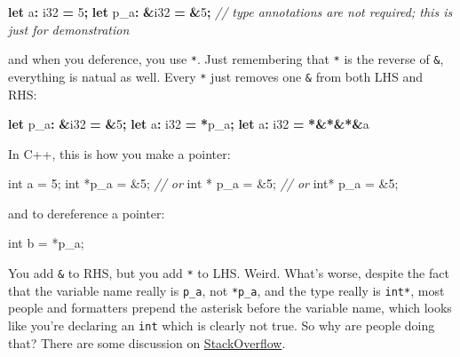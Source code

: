 \documentclass[
]{book}
\newenvironment{Shaded}{\begin{snugshade}}{\end{snugshade}}
\newcommand{\CommentTok}[1]{\textcolor[rgb]{0.56,0.35,0.01}{\textit{#1}}}
\newcommand{\DataTypeTok}[1]{\textcolor[rgb]{0.13,0.29,0.53}{#1}}
\newcommand{\DecValTok}[1]{\textcolor[rgb]{0.00,0.00,0.81}{#1}}
\newcommand{\KeywordTok}[1]{\textcolor[rgb]{0.13,0.29,0.53}{\textbf{#1}}}
\newcommand{\NormalTok}[1]{#1}
\newcommand{\OperatorTok}[1]{\textcolor[rgb]{0.81,0.36,0.00}{\textbf{#1}}}
\begin{document}
\begin{Shaded}
\begin{Highlighting}[]
\KeywordTok{let}\NormalTok{   a}\OperatorTok{:}  \DataTypeTok{i32} \OperatorTok{=}  \DecValTok{5}\OperatorTok{;}
\KeywordTok{let}\NormalTok{ p\_a}\OperatorTok{:} \OperatorTok{\&}\DataTypeTok{i32} \OperatorTok{=} \OperatorTok{\&}\DecValTok{5}\OperatorTok{;} \CommentTok{// type annotations are not required; this is just for demonstration}
\end{Highlighting}
\end{Shaded}

and when you deference, you use \texttt{*}. Just remembering that \texttt{*} is the reverse of \texttt{\&}, everything is natual as well. Every \texttt{*} just removes one \texttt{\&} from both LHS and RHS:

\begin{Shaded}
\begin{Highlighting}[]
\KeywordTok{let}\NormalTok{ p\_a}\OperatorTok{:} \OperatorTok{\&}\DataTypeTok{i32} \OperatorTok{=} \OperatorTok{\&}\DecValTok{5}\OperatorTok{;}
\KeywordTok{let}\NormalTok{   a}\OperatorTok{:}  \DataTypeTok{i32} \OperatorTok{=} \OperatorTok{*}\NormalTok{p\_a}\OperatorTok{;}
\KeywordTok{let}\NormalTok{   a}\OperatorTok{:}  \DataTypeTok{i32} \OperatorTok{=} \OperatorTok{*\&*\&*\&}\NormalTok{a}
\end{Highlighting}
\end{Shaded}

In C++, this is how you make a pointer:

\begin{Shaded}
\begin{Highlighting}[]
\DataTypeTok{int}\NormalTok{    a =  }\DecValTok{5}\NormalTok{;}
\DataTypeTok{int}\NormalTok{ *p\_a = \&}\DecValTok{5}\NormalTok{;}
\CommentTok{// or}
\DataTypeTok{int}\NormalTok{ * p\_a = \&}\DecValTok{5}\NormalTok{;}
\CommentTok{// or}
\DataTypeTok{int}\NormalTok{*  p\_a = \&}\DecValTok{5}\NormalTok{;}
\end{Highlighting}
\end{Shaded}

and to dereference a pointer:

\begin{Shaded}
\begin{Highlighting}[]
\DataTypeTok{int}\NormalTok{ b = *p\_a;}
\end{Highlighting}
\end{Shaded}

You add \texttt{\&} to RHS, but you add \texttt{*} to LHS. Weird. What's worse, despite the fact that the variable name really is \texttt{p\_a}, not \texttt{*p\_a}, and the type really is \texttt{int*}, most people and formatters prepend the asterisk before the variable name, which looks like you're declaring an \texttt{int} which is clearly not true. So why are people doing that? There are some discussion on \href{https://stackoverflow.com/questions/398395/why-is-the-asterisk-before-the-variable-name-rather-than-after-the-type}{StackOverflow}.
\end{document}
